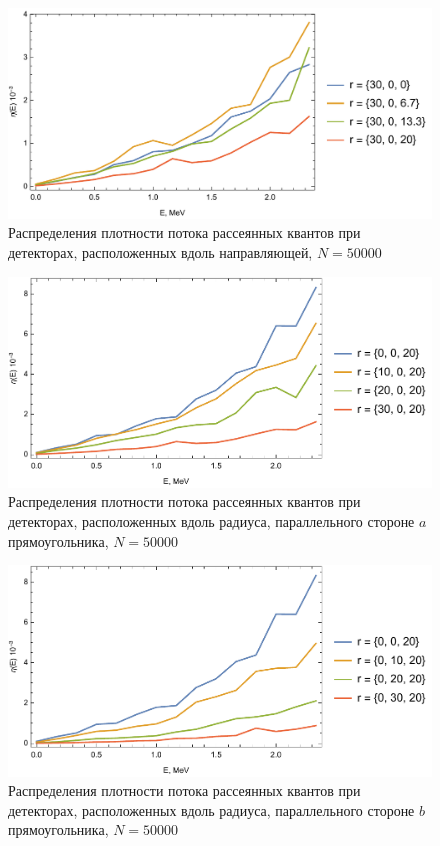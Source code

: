 \documentclass[
11pt,
master, %
subf, %
href, %
colorlinks=true, %
]{disser}
\begin{document}
\newpage
\begin{figure}[htbp]
  \centering
  \includegraphics[width=0.95\linewidth]{50k_1}
  \caption{Распределения плотности потока рассеянных
квантов при детекторах, расположенных вдоль направляющей, $N = 50000$}\label{}
\end{figure}

\begin{figure}[htbp]
  \centering
  \includegraphics[width=0.95\linewidth]{50k_2}
  \caption{Распределения плотности потока рассеянных
квантов при детекторах, расположенных вдоль радиуса, параллельного стороне $a$ прямоугольника, $N = 50000$}\label{}
\end{figure}

\newpage
\begin{figure}[htbp]
  \centering
  \includegraphics[width=0.95\linewidth]{50k_3}
  \caption{Распределения плотности потока рассеянных
квантов при детекторах, расположенных вдоль радиуса, параллельного стороне $b$ прямоугольника, $N = 50000$}\label{}
\end{figure}
\end{document}
